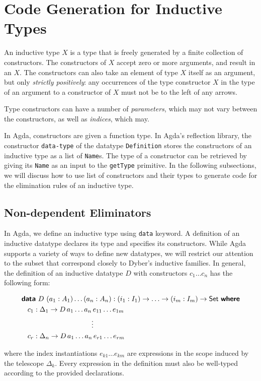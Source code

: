 \documentclass[sigplan,10pt]{acmart}
\begin{document}
\section{Code Generation for Inductive Types}
\label{sec:sec3}
An inductive type $X$ is a type that is freely generated by a finite collection of constructors. The constructors of $X$ accept zero or more arguments, and result in an $X$. The constructors can also take an element of type $X$ itself as an argument, but only \emph{strictly positively}: any occurrences of the type constructor $X$ in the type of an argument to a constructor of $X$ must not be to the left of any arrows.

Type constructors can have a number of \emph{parameters}, which may not vary between the constructors, as well as \emph{indices}, which may.


In Agda, constructors are given a function type. In Agda's reflection library, the constructor {\tt data-type} of the datatype {\tt Definition} stores the constructors of an inductive type as a list of \texttt{Name}s. The type of a constructor can be retrieved by giving its {\tt Name} as an input to the {\tt getType} primitive. In the following subsections, we will discuss how to use list of constructors and their types to generate code for the elimination rules of an inductive type.

\subsection{Non-dependent Eliminators}
\label{sec:sec3.1}

\newcommand*{\KW}[1]{\textsf{\textbf{#1}}}
\newcommand*{\SET}{\textsf{Set}}

In Agda, we define an inductive type using {\tt data} keyword. A definition of an inductive datatype declares its type and specifies its constructors.
While Agda supports a variety of ways to define new datatypes, we will restrict our attention to the subset that correspond closely to Dyber's inductive families. In general, the definition of an inductive datatype $D$ with constructors $c_1 \ldots c_n$ has the following form:
\begin{center}
\begingroup
\fontsize{7.9pt}{0pt}\selectfont
\begin{align*}
&\KW{data}\ D\ (a_1 : A_1) \ldots (a_n:A_n) : (i_1 : I_1) \rightarrow\ldots\rightarrow (i_m : I_m) \rightarrow \SET{}\ \KW{where}  \\
&\hspace{0.3cm} c_1 : \Delta_1 \rightarrow D \, a_1 \ldots a_n \, e_{11} \ldots e_{1m}  \\
&\hspace{3.5cm} \vdots  \\
&\hspace{0.3cm} c_r : \Delta_n \rightarrow D \, a_1 \ldots a_n \, e_{r1} \ldots e_{rm}  \\
\end{align*}
\endgroup
\end{center}
\normalsize
where the index instantiations $e_{k1} \ldots e_{km}$ are expressions in the scope induced by the telescope $\Delta_k$. Every expression in the definition must also be well-typed according to the provided declarations.
\end{document}
